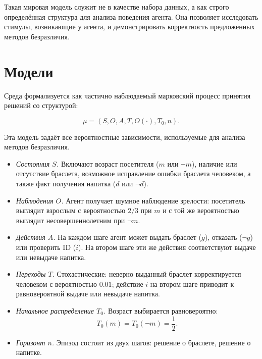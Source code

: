 Такая мировая модель служит не в качестве набора данных, а как строго 
определённая структура для анализа поведения агента. Она позволяет 
исследовать стимулы, возникающие у агента, и демонстрировать корректность 
предложенных методов безразличия.

\section{Модели}

Среда формализуется как частично наблюдаемый марковский процесс принятия решений 
со структурой:

\begin{equation}
    \mu = (S, O, A, T, O(\cdot), T_0, n).
\end{equation}

Эта модель задаёт все вероятностные зависимости, используемые для анализа методов 
безразличия.

\begin{itemize}
    \item \emph{Состояния $S$.} Включают возраст посетителя ($m$ или $\lnot m$), 
    наличие или отсутствие браслета, возможное исправление ошибки браслета 
    человеком, а также факт получения напитка ($d$ или $\lnot d$).

    \item \emph{Наблюдения $O$.} Агент получает шумное наблюдение зрелости: 
    посетитель выглядит взрослым с вероятностью $2/3$ при $m$ и с той же 
    вероятностью выглядит несовершеннолетним при $\lnot m$.

    \item \emph{Действия $A$.} На каждом шаге агент может выдать браслет ($g$), 
    отказать ($\lnot g$) или проверить ID ($i$). На втором шаге эти же действия 
    соответствуют выдаче или невыдаче напитка.

    \item \emph{Переходы $T$.} Стохастические: неверно выданный браслет 
    корректируется человеком с вероятностью $0.01$; действие $i$ на втором шаге 
    приводит к равновероятной выдаче или невыдаче напитка.

    \item \emph{Начальное распределение $T_0$.} Возраст выбирается равновероятно:
    \begin{equation}
        T_0(m) = T_0(\lnot m) = \frac{1}{2}.
    \end{equation}

    \item \emph{Горизонт $n$.} Эпизод состоит из двух шагов: решение о браслете, 
    решение о напитке.
\end{itemize}
